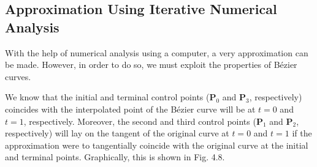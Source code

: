 \documentclass[12pt, oneside, appendixprefix=Appendix]{article}
\theoremstyle{definition}
\newenvironment{equation_nogap} %
{\begin{smallskip} \begin{centering} \begin{spacing}{1.0} $} %
{$ \end{spacing} \end{centering} \end{smallskip}}
\numberwithin{figure}{section}
\begin{document}
%
%
%

\subsection{Approximation Using Iterative Numerical Analysis}

With the help of numerical analysis using a computer, a very approximation can be made. However, in order to do so, we must exploit the properties of B\'ezier curves.

We know that the initial and terminal control points ($\bm{P}_0$ and $\bm{P}_3$, respectively) coincides with the interpolated point of the B\'ezier curve will be at $t=0$ and $t=1$, respectively. Moreover, the second and third control points ($\bm{P}_1$ and $\bm{P}_2$, respectively) will lay on the tangent of the original curve at $t=0$ and $t=1$ if the approximation were to tangentially coincide with the original curve at the initial and terminal points. Graphically, this is shown in Fig. 4.8.
\end{document}
